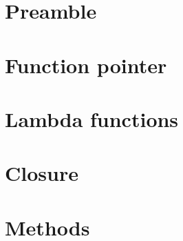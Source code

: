\section{Preamble}

\section{Function pointer}
\section{Lambda functions}
\section{Closure}
\label{sec:closure}

\section{Methods}
